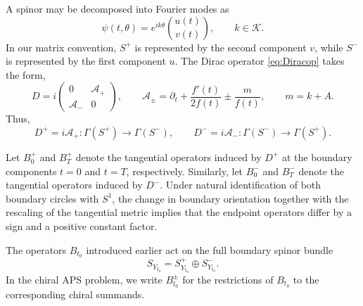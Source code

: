 \documentclass[11pt]{article}
\theoremstyle{definition}
\numberwithin{equation}{section}
\begin{document}
A spinor may be decomposed into Fourier modes as
\begin{equation}
\psi(t,\theta)=e^{ik\theta}\binom{u(t)}{v(t)},
\qquad k\in\mathcal K.
\end{equation}
In our matrix convention, $S^+$ is represented by the second component $v$, while $S^-$ is represented by the first component $u$.
The Dirac operator \eqref{eq:Diracop} takes the form,
\begin{equation}
D
=
i\begin{pmatrix}
0 & \mathcal{A}_+ \\
\mathcal{A}_- & 0
\end{pmatrix},
\qquad
\mathcal A_\pm
=
\partial_t+\frac{f'(t)}{2f(t)}\pm \frac{m}{f(t)},
\qquad
m=k+A.
\end{equation}
Thus,
\begin{equation}
D^+=i\mathcal{A}_+:\Gamma(S^+)\to\Gamma(S^-),
\qquad
D^-=i\mathcal{A}_-:\Gamma(S^-)\to\Gamma(S^+).
\end{equation}

Let $B_0^+$ and $B_T^+$ denote the tangential operators induced by $D^+$ at the boundary components $t=0$ and $t=T$, respectively. Similarly, let $B_0^-$ and $B_T^-$ denote the tangential operators induced by $D^-$. Under natural identification of both boundary circles with $S^1$, the change in boundary orientation together with the rescaling of the tangential metric implies that the endpoint operators differ by a sign and a positive constant factor.

The operators \(B_{t_0}\) introduced earlier act on the full boundary spinor bundle
\begin{equation}
S_{Y_{t_0}}=S^+_{Y_{t_0}}\oplus S^-_{Y_{t_0}}.
\end{equation}
In the chiral APS problem, we write \(B_{t_0}^\pm\) for the restrictions of \(B_{t_0}\) to the corresponding chiral summands.
\end{document}
